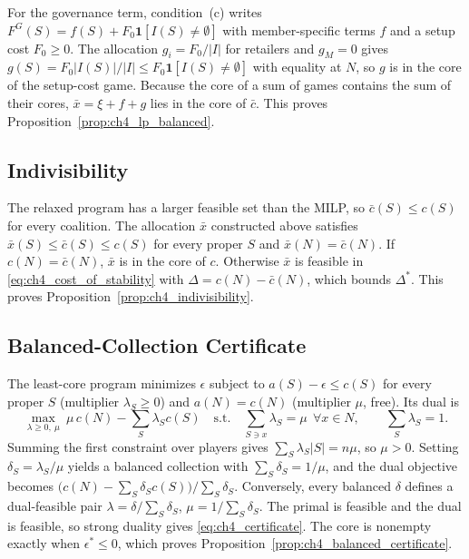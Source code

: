 For the governance term, condition~(c) writes
$F^G(S)=f(S)+F_0\mathbf{1}[I(S)\neq\emptyset]$ with member-specific terms $f$
and a setup cost $F_0\geq0$. The allocation $g_i=F_0/|I|$ for retailers and
$g_M=0$ gives $g(S)=F_0|I(S)|/|I|\leq F_0\mathbf{1}[I(S)\neq\emptyset]$ with
equality at $N$, so $g$ is in the core of the setup-cost game. Because the core
of a sum of games contains the sum of their cores, $\bar x=\xi+f+g$ lies in the
core of $\bar c$. This proves Proposition~\ref{prop:ch4_lp_balanced}.

\subsection{Indivisibility}

The relaxed program has a larger feasible set than the MILP, so
$\bar c(S)\leq c(S)$ for every coalition. The allocation $\bar x$ constructed
above satisfies $\bar x(S)\leq\bar c(S)\leq c(S)$ for every proper $S$ and
$\bar x(N)=\bar c(N)$. If $c(N)=\bar c(N)$, $\bar x$ is in the core of $c$.
Otherwise $\bar x$ is feasible in \eqref{eq:ch4_cost_of_stability} with
$\Delta=c(N)-\bar c(N)$, which bounds $\Delta^*$. This proves
Proposition~\ref{prop:ch4_indivisibility}.

\subsection{Balanced-Collection Certificate}

The least-core program minimizes $\epsilon$ subject to
$a(S)-\epsilon\leq c(S)$ for every proper $S$ (multiplier $\lambda_S\geq0$) and
$a(N)=c(N)$ (multiplier $\mu$, free). Its dual is
\begin{equation*}
\max_{\lambda\geq0,\ \mu}\ \mu\,c(N)-\sum_S\lambda_Sc(S)
\quad\text{s.t.}\quad
\sum_{S\ni x}\lambda_S=\mu\ \ \forall x\in N,
\qquad
\sum_S\lambda_S=1 .
\end{equation*}
Summing the first constraint over players gives
$\sum_S\lambda_S|S|=n\mu$, so $\mu>0$. Setting $\delta_S=\lambda_S/\mu$ yields
a balanced collection with $\sum_S\delta_S=1/\mu$, and the dual objective
becomes $\big(c(N)-\sum_S\delta_Sc(S)\big)/\sum_S\delta_S$. Conversely, every
balanced $\delta$ defines a dual-feasible pair
$\lambda=\delta/\sum_S\delta_S$, $\mu=1/\sum_S\delta_S$. The primal is feasible
and the dual is feasible, so strong duality gives \eqref{eq:ch4_certificate}.
The core is nonempty exactly when $\epsilon^*\leq0$, which proves
Proposition~\ref{prop:ch4_balanced_certificate}.

